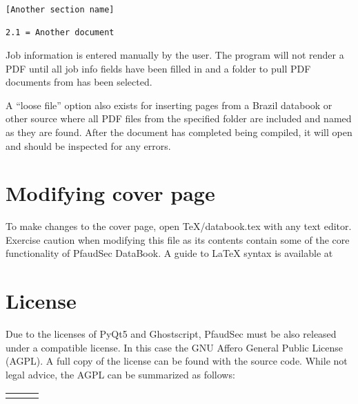 \documentclass[14pt]{article}
\newcommand{\chref}[3][black]{\href{#2}{\color{#1}{#3}}}%
\begin{document}
\begin{flushleft}
\begin{tcolorbox}[
coltitle=black, title=\centering Example sections\_config.ini,
boxrule=0.5pt, colback=backgrey, colframe=bordergrey, sharpish corners]
\begin{verbatim}
[Another section name]

2.1 = Another document

\end{verbatim}
\end{tcolorbox}

\noindent Job information is entered manually by the user. The program will not render a PDF until all job info fields have been filled in and a folder to pull PDF documents from has been selected.

A ``loose file'' option also exists for inserting pages from a Brazil databook or other source where all PDF files from the specified folder are included and named as they are found.
After the document has completed being compiled, it will open and should be inspected for any errors.
\setlength{\parindent}{0in}

\section{Modifying cover page}

To make changes to the cover page, open TeX/databook.tex with any text editor.
Exercise caution when modifying this file as its contents contain some of the core functionality of PfaudSec DataBook.
A guide to \LaTeX\xspace syntax is available at 
\chref[pfblue]
{https://en.wikibooks.org/wiki/LaTeX/Basics}
{https://en.wikibooks.org/wiki/LaTeX/Basics}

\section{License}

Due to the licenses of PyQt5 and Ghostscript, PfaudSec must be also released under a compatible license.
In this case the GNU Affero General Public License (AGPL).
A full copy of the license can be found with the source code.
While not legal advice, the AGPL can be summarized as follows:\\[\normalbaselineskip]

\def\tabularxcolumn#1{m{#1}}%
\begin{tabularx}{\textwidth}{YYY}

\begin{tcolorbox}[
	equal height group=license, coltitle=black, title=\centering Must,
	boxrule=0.5pt, colback=backgrey, colframe=bordergrey, sharpish corners] 
\begin{itemize}[leftmargin=*]


\end{itemize}
\end{tcolorbox}
\end{tabularx}
\end{flushleft}
\end{document}
